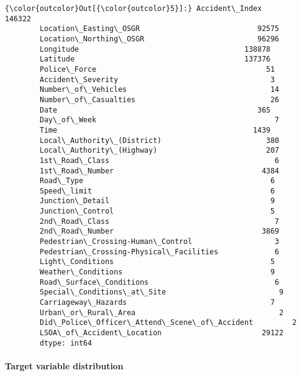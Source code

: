 \documentclass[11pt]{article}
\begin{document}
\begin{Verbatim}[commandchars=\\\{\}]
{\color{outcolor}Out[{\color{outcolor}5}]:} Accident\_Index                                 146322
        Location\_Easting\_OSGR                           92575
        Location\_Northing\_OSGR                          96296
        Longitude                                      138878
        Latitude                                       137376
        Police\_Force                                       51
        Accident\_Severity                                   3
        Number\_of\_Vehicles                                 14
        Number\_of\_Casualties                               26
        Date                                              365
        Day\_of\_Week                                         7
        Time                                             1439
        Local\_Authority\_(District)                        380
        Local\_Authority\_(Highway)                         207
        1st\_Road\_Class                                      6
        1st\_Road\_Number                                  4384
        Road\_Type                                           6
        Speed\_limit                                         6
        Junction\_Detail                                     9
        Junction\_Control                                    5
        2nd\_Road\_Class                                      7
        2nd\_Road\_Number                                  3869
        Pedestrian\_Crossing-Human\_Control                   3
        Pedestrian\_Crossing-Physical\_Facilities             6
        Light\_Conditions                                    5
        Weather\_Conditions                                  9
        Road\_Surface\_Conditions                             6
        Special\_Conditions\_at\_Site                          9
        Carriageway\_Hazards                                 7
        Urban\_or\_Rural\_Area                                 2
        Did\_Police\_Officer\_Attend\_Scene\_of\_Accident         2
        LSOA\_of\_Accident\_Location                       29122
        dtype: int64
\end{Verbatim}
            
    \paragraph{Target variable
distribution}\label{target-variable-distribution}
\end{document}
